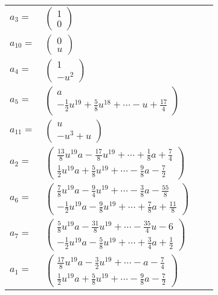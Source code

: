 \documentclass[1p]{elsarticle_modified}
\theoremstyle{definition}
\begin{document}
\begin{tabular}{m{7pt} m{180pt} m{7pt} m{180pt} }
\flushright $a_{3}=$&$\begin{pmatrix}1\\0\end{pmatrix}$ \\
\flushright $a_{10}=$&$\begin{pmatrix}0\\u\end{pmatrix}$ \\
\flushright $a_{4}=$&$\begin{pmatrix}1\\- u^2\end{pmatrix}$ \\
\flushright $a_{5}=$&$\begin{pmatrix}a\\-\frac{1}{2} u^{19}+\frac{5}{8} u^{18}+\cdots- u+\frac{17}{4}\end{pmatrix}$ \\
\flushright $a_{11}=$&$\begin{pmatrix}u\\- u^3+u\end{pmatrix}$ \\
\flushright $a_{2}=$&$\begin{pmatrix}\frac{13}{8} u^{19} a-\frac{17}{8} u^{19}+\cdots+\frac{1}{8} a+\frac{7}{4}\\\frac{1}{2} u^{19} a+\frac{5}{8} u^{19}+\cdots-\frac{9}{8} a-\frac{7}{2}\end{pmatrix}$ \\
\flushright $a_{6}=$&$\begin{pmatrix}\frac{7}{8} u^{19} a-\frac{9}{4} u^{19}+\cdots-\frac{3}{8} a-\frac{55}{8}\\-\frac{1}{2} u^{19} a-\frac{9}{8} u^{19}+\cdots+\frac{7}{8} a+\frac{11}{8}\end{pmatrix}$ \\
\flushright $a_{7}=$&$\begin{pmatrix}\frac{5}{8} u^{19} a-\frac{31}{8} u^{19}+\cdots-\frac{35}{4} u-6\\-\frac{1}{2} u^{19} a-\frac{5}{8} u^{19}+\cdots+\frac{3}{4} a+\frac{1}{2}\end{pmatrix}$ \\
\flushright $a_{1}=$&$\begin{pmatrix}\frac{17}{8} u^{19} a-\frac{3}{2} u^{19}+\cdots- a-\frac{7}{4}\\\frac{1}{2} u^{19} a+\frac{5}{8} u^{19}+\cdots-\frac{9}{8} a-\frac{7}{2}\end{pmatrix}$ \\

\end{tabular}
\end{document}
